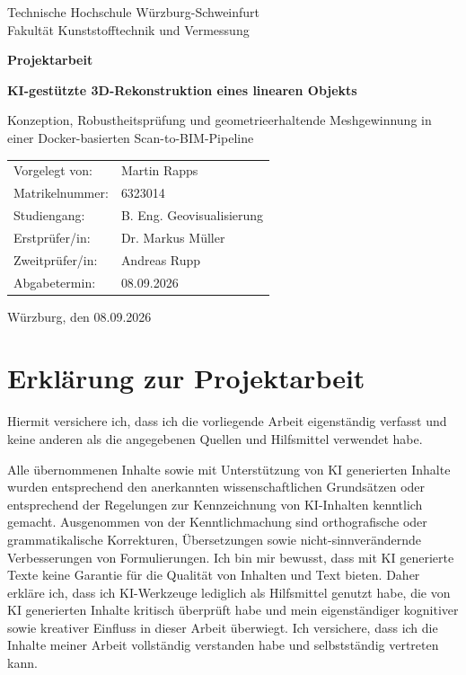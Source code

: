 \documentclass[12pt,a4paper]{article}
\newcommand{\thwsAuthor}{Martin Rapps}
\newcommand{\thwsMatriculation}{6323014}
\newcommand{\thwsDegree}{B. Eng. Geovisualisierung}
\newcommand{\thwsFirstExaminer}{Dr. Markus Müller}
\newcommand{\thwsSecondExaminer}{Andreas Rupp}
\newcommand{\thwsSubmissionDate}{08.09.2026}
\newif\ifanonym
\begin{document}
\thispagestyle{empty}
\begin{center}
	{\large Technische Hochschule Würzburg-Schweinfurt\\
	Fakultät Kunststofftechnik und Vermessung\par}
	\vfill
	{\LARGE\bfseries Projektarbeit\par}
	\vspace{1.2cm}
	{\Large\bfseries KI-gestützte 3D-Rekonstruktion eines linearen Objekts\par}
	\vspace{0.4cm}
	{\large Konzeption, Robustheitsprüfung und geometrieerhaltende
	Meshgewinnung in einer Docker-basierten Scan-to-BIM-Pipeline\par}
	\vfill
	\begin{tabular}{@{}ll@{}}
		\ifanonym Studiengang: & \thwsDegree\\
		\else Vorgelegt von: & \thwsAuthor\\
		Matrikelnummer: & \thwsMatriculation\\
		Studiengang: & \thwsDegree\\
		\fi
		Erstprüfer/in: & \thwsFirstExaminer\\
		Zweitprüfer/in: & \thwsSecondExaminer\\
		Abgabetermin: & \thwsSubmissionDate
	\end{tabular}
	\vfill
	Würzburg, den \thwsSubmissionDate
\end{center}
\clearpage

\section*{Erklärung zur Projektarbeit}
Hiermit versichere ich, dass ich die vorliegende Arbeit eigenständig verfasst
und keine anderen als die angegebenen Quellen und Hilfsmittel verwendet habe.

Alle übernommenen Inhalte sowie mit Unterstützung von KI generierten Inhalte
wurden entsprechend den anerkannten wissenschaftlichen Grundsätzen oder
entsprechend der Regelungen zur Kennzeichnung von KI-Inhalten kenntlich
gemacht. Ausgenommen von der Kenntlichmachung sind orthografische oder
grammatikalische Korrekturen, Übersetzungen sowie nicht-sinnverändernde
Verbesserungen von Formulierungen. Ich bin mir bewusst, dass mit KI generierte
Texte keine Garantie für die Qualität von Inhalten und Text bieten. Daher
erkläre ich, dass ich KI-Werkzeuge lediglich als Hilfsmittel genutzt habe, die
von KI generierten Inhalte kritisch überprüft habe und mein eigenständiger
kognitiver sowie kreativer Einfluss in dieser Arbeit überwiegt. Ich versichere,
dass ich die Inhalte meiner Arbeit vollständig verstanden habe und
selbstständig vertreten kann.
\end{document}
